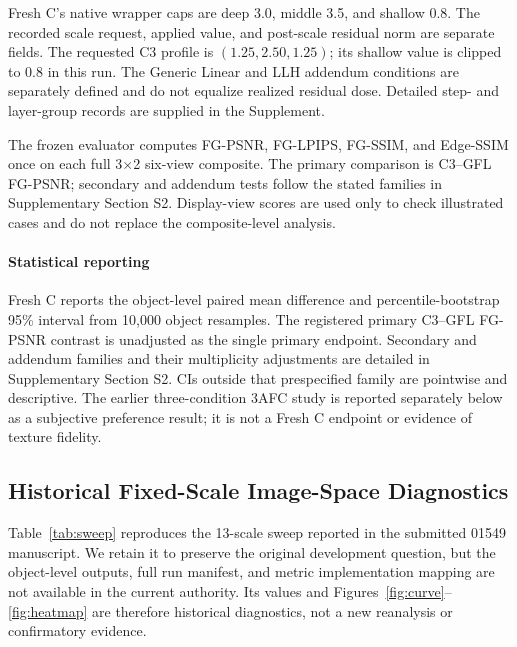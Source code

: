 \documentclass[times,twocolumn,final]{elsarticle}
\begin{document}
Fresh C's native wrapper caps are deep 3.0, middle 3.5, and shallow 0.8. The recorded scale request, applied value, and post-scale residual norm are separate fields. The requested C3 profile is $(1.25,2.50,1.25)$; its shallow value is clipped to 0.8 in this run. The Generic Linear and LLH addendum conditions are separately defined and do not equalize realized residual dose. Detailed step- and layer-group records are supplied in the Supplement.

The frozen evaluator computes FG-PSNR, FG-LPIPS, FG-SSIM, and Edge-SSIM once on each full 3$\times$2 six-view composite. The primary comparison is C3--GFL FG-PSNR; secondary and addendum tests follow the stated families in Supplementary Section S2. Display-view scores are used only to check illustrated cases and do not replace the composite-level analysis.

\paragraph{Statistical reporting}
Fresh C reports the object-level paired mean difference and percentile-bootstrap 95\% interval from 10{,}000 object resamples. The registered primary C3--GFL FG-PSNR contrast is unadjusted as the single primary endpoint. Secondary and addendum families and their multiplicity adjustments are detailed in Supplementary Section S2. CIs outside that prespecified family are pointwise and descriptive. The earlier three-condition 3AFC study is reported separately below as a subjective preference result; it is not a Fresh C endpoint or evidence of texture fidelity.

\subsection{Historical Fixed-Scale Image-Space Diagnostics}
\label{subsec:tradeoff}

Table~\ref{tab:sweep} reproduces the 13-scale sweep reported in the submitted 01549 manuscript. We retain it to preserve the original development question, but the object-level outputs, full run manifest, and metric implementation mapping are not available in the current authority. Its values and Figures~\ref{fig:curve}--\ref{fig:heatmap} are therefore historical diagnostics, not a new reanalysis or confirmatory evidence.
\end{document}
